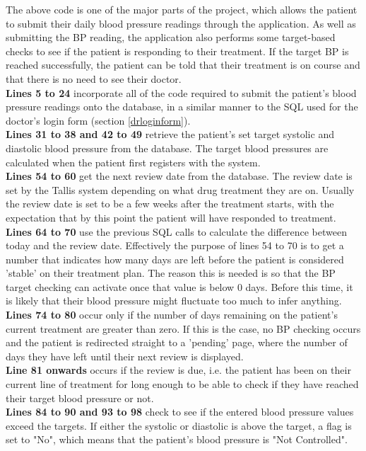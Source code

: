 \documentclass[11pt]{article}
\begin{document}
The above code is one of the major parts of the project, which allows the patient to submit their daily blood pressure readings through the application. As well as submitting the BP reading, the application also performs some target-based checks to see if the patient is responding to their treatment. If the target BP is reached successfully, the patient can be told that their treatment is on course and that there is no need to see their doctor.
\\
\textbf{Lines 5 to 24} incorporate all of the code required to submit the patient's blood pressure readings onto the database, in a similar manner to the SQL used for the doctor's login form (section \ref{drloginform}). 
\\
\textbf{Lines 31 to 38 and 42 to 49} retrieve the patient's set target systolic and diastolic blood pressure from the database. The target blood pressures are calculated when the patient first registers with the system.
\\
\textbf{Lines 54 to 60} get the next review date from the database. The review date is set by the Tallis system depending on what drug treatment they are on. Usually the review date is set to be a few weeks after the treatment starts, with the expectation that by this point the patient will have responded to treatment.
\\
\textbf{Lines 64 to 70} use the previous SQL calls to calculate the difference between today and the review date. Effectively the purpose of lines 54 to 70 is to get a number that indicates how many days are left before the patient is considered 'stable' on their treatment plan. The reason this is needed is so that the BP target checking can activate once that value is below 0 days. Before this time, it is likely that their blood pressure might fluctuate too much to infer anything.
\\
\textbf{Lines 74 to 80} occur only if the number of days remaining on the patient's current treatment are greater than zero. If this is the case, no BP checking occurs and the patient is redirected straight to a 'pending' page, where the number of days they have left until their next review is displayed. 
\\
\textbf{Line 81 onwards} occurs if the review is due, i.e. the patient has been on their current line of treatment for long enough to be able to check if they have reached their target blood pressure or not.
\\
\textbf{Lines 84 to 90 and 93 to 98} check to see if the entered blood pressure values exceed the targets. If either the systolic or diastolic is above the target, a flag is set to "No", which means that the patient's blood pressure is "Not Controlled".
\end{document}
